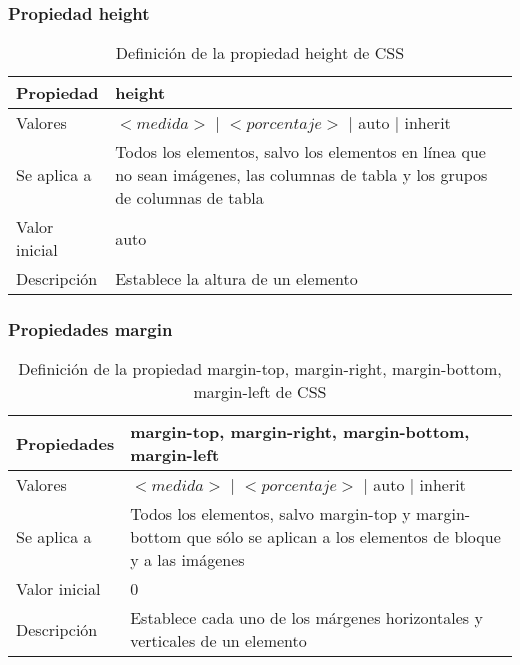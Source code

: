\begin{frame}
\frametitle{Propiedad height}

\begin{center}
  \begin{table}
   \begin{tabular}{p{1.8cm}p{7.8cm}}
Propiedad &\bf{height} \\ \hline
Valores & $<medida>$ | $<porcentaje>$ | auto | inherit \\ \hline
Se aplica a & Todos los elementos, salvo los elementos en línea que no sean imágenes, las columnas de tabla y los grupos de columnas de tabla \\ \hline
Valor inicial & auto \\ \hline
Descripción & Establece la altura de un elemento \\ \hline
  \end{tabular}
   \caption{Definición de la propiedad height de CSS}
 \end{table}
\end{center}

\end{frame}


\begin{frame}
\frametitle{Propiedades margin}

\begin{center}
  \begin{table}
   \begin{tabular}{p{1.8cm}p{7.8cm}}
Propiedades &\bf{margin-top}, \bf{margin-right}, \bf{margin-bottom}, \bf{margin-left} \\ \hline
Valores & $<medida>$ | $<porcentaje>$ | auto | inherit \\ \hline
Se aplica a & Todos los elementos, salvo margin-top y margin-bottom que sólo se aplican a los elementos de bloque y a las imágenes \\ \hline
Valor inicial & 0 \\ \hline
Descripción & Establece cada uno de los márgenes horizontales y verticales de un elemento \\  \hline
  \end{tabular}
    \caption{Definición de la propiedad margin-top, margin-right, margin-bottom, margin-left de CSS}
 \end{table}
\end{center}

\end{frame}

